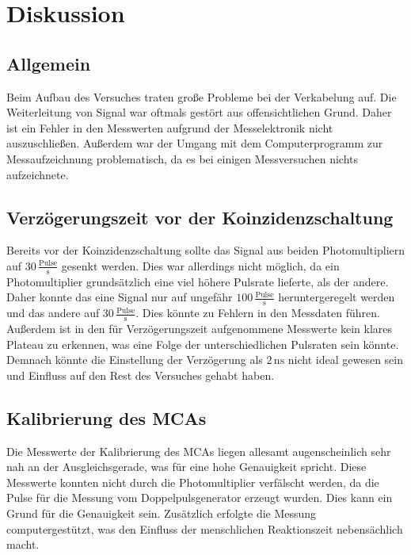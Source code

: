 \section{Diskussion}
\label{sec:Diskussion}
\subsection{Allgemein}
Beim Aufbau des Versuches traten große Probleme bei der Verkabelung auf. Die Weiterleitung von Signal war oftmals gestört aus 
offensichtlichen Grund. Daher ist ein Fehler in den Messwerten aufgrund der Messelektronik nicht auszuschließen. Außerdem war 
der Umgang mit dem Computerprogramm zur Messaufzeichnung problematisch, da es bei einigen Messversuchen nichts aufzeichnete. 

\subsection{Verzögerungszeit vor der Koinzidenzschaltung}
Bereits vor der Koinzidenzschaltung sollte das Signal aus beiden Photomultipliern auf $30 \,\frac{\text{Pulse}}{\unit{\second}}$ gesenkt 
werden. Dies war allerdings nicht möglich, da ein Photomultiplier grundsätzlich eine viel höhere Pulsrate lieferte, als der andere. 
Daher konnte das eine Signal nur auf ungefähr $100 \,\frac{\text{Pulse}}{\unit{\second}}$ heruntergeregelt werden und das andere 
auf $30 \,\frac{\text{Pulse}}{\unit{\second}}$. Dies könnte zu Fehlern in den Messdaten führen. Außerdem ist in den für 
Verzögerungszeit aufgenommene Messwerte kein klares Plateau zu erkennen, was eine Folge der unterschiedlichen Pulsraten sein könnte. 
Demnach könnte die Einstellung der Verzögerung als $2 \, \unit{\nano\second}$ nicht ideal gewesen sein und Einfluss auf den Rest des 
Versuches gehabt haben. 

\subsection{Kalibrierung des MCAs}
Die Messwerte der Kalibrierung des MCAs liegen allesamt augenscheinlich sehr nah an der Ausgleichsgerade, was für eine hohe 
Genauigkeit spricht. Diese Messwerte konnten nicht durch die Photomultiplier verfälscht werden, da die Pulse für die Messung 
vom Doppelpulsgenerator erzeugt wurden. Dies kann ein Grund für die Genauigkeit sein. Zusätzlich erfolgte die Messung computergestützt,
was den Einfluss der menschlichen Reaktionszeit nebensächlich macht. 

